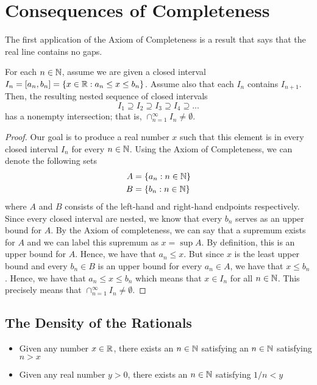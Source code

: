 
\section{Consequences of Completeness}

The first application of the Axiom of Completeness is a result that says that the real line contains no gaps. 

\begin{theorem}
        For each \( n \in \mathbb{N} \), assume we are given a closed interval \( I_n = [a_n, b_n ] = \{ x \in \mathbb{R} : a_n \leq x \leq b_n \} \). Assume also that each \( I_n \) contains \( I_{n+1}\). Then, the resulting nested sequence of closed intervals 
        \[ I_1 \supseteq I_2 \supseteq I_3 \supseteq I_4 \supseteq ... \]
        has a nonempty intersection; that is, \( \cap_{n=1}^{\infty} I_n \neq \emptyset \).
    \end{theorem}

\begin{proof}
    Our goal is to produce a real number \( x \) such that this element is in every closed interval \( I_n \) for every \( n \in \mathbb{N} \). Using the Axiom of Completeness, we can denote the following sets 
    \begin{align*} A &= \{  a_n : n \in \mathbb{N}  \} \\ 
                   B &= \{  b_n : n \in \mathbb{N}  \}
     \end{align*} 
    where \( A \) and \( B \) consists of the left-hand and right-hand endpoints respectively. Since every closed interval are nested, we know that every \( b_n \) serves as an upper bound for \( A \). By the Axiom of completeness, we can say that a supremum exists for \( A \) and we can label this supremum as \( x = \sup A \). By definition, this is an upper bound for \( A \). Hence, we have that \( a_n \leq x \). But since \( x \) is the least upper bound and every \( b_n \in B \) is an upper bound for every \( a_n \in A \), we have that \( x \leq b_n \). Hence, we have that \( a_n \leq x \leq b_n \) which means that \( x \in I_n \) for all \( n \in \mathbb{N} \). This precisely means that \( \cap_{n=1}^{\infty} I_n \neq \emptyset \).
\end{proof}

\subsection{The Density of the Rationals }

\begin{theorem}{}
    \begin{itemize}
        
        \item Given any number \( x \in \mathbb{R} \), there exists an \( n \in \mathbb{N} \) satisfying an \( n \in \mathbb{N} \) satisfying \( n > x \)
        \item Given any real number \( y > 0 \), there exists an \( n \in \mathbb{N} \) satisfying \( 1/n < y \)

    \end{itemize}
    
\end{theorem}

